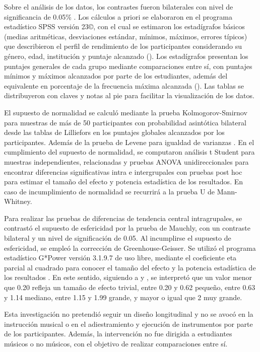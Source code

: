 \documentclass[spanish]{textolivre}
\begin{document}
Sobre el análisis de los datos, los contrastes fueron bilaterales con nivel de significancia de 0.05\% \cite{hernandez2014metodologia}. Los cálculos a priori se elaboraron en el programa estadístico SPSS versión 23©, con el cual se estimaron los estadígrafos básicos (medias aritméticas, desviaciones estándar, mínimos, máximos, errores típicos) que describieron el perfil de rendimiento de los participantes considerando su género, edad, institución y puntaje alcanzado (). Los estadígrafos presentan los puntajes generales de cada grupo mediante comparaciones entre sí, con puntajes mínimos y máximos alcanzados por parte de los estudiantes, además del equivalente en porcentaje de la frecuencia máxima alcanzada (). Las tablas se distribuyeron con claves y notas al pie para facilitar la visualización de los datos.

El supuesto de normalidad se calculó mediante la prueba Kolmogorov-Smirnov para muestras de más de 50 participantes con probabilidad asintótica bilateral desde las tablas de Lilliefors en los puntajes globales alcanzados por los participantes. Además de la prueba de Levene para igualdad de varianzas \cite{hernandez2014metodologia}. En el cumplimiento del supuesto de normalidad, se computaron análisis t Student para muestras independientes, relacionadas y pruebas ANOVA unidireccionales para encontrar diferencias significativas intra e intergrupales con pruebas post hoc para estimar el tamaño del efecto y potencia estadística de los resultados. En caso de incumplimiento de normalidad se recurrirá a la prueba U de Mann-Whitney.

Para realizar las pruebas de diferencias de tendencia central intragrupales, se contrastó el supuesto de esfericidad por la prueba de Mauchly, con un contraste bilateral y un nivel de significación de 0.05. Al incumplirse el supuesto de esfericidad, se empleó la corrección de Greenhouse-Geisser. Se utilizó el programa estadístico G*Power versión 3.1.9.7 de uso libre, mediante el coeficiente eta parcial al cuadrado para conocer el tamaño del efecto y la potencia estadística de los resultados \cite{cardenascastro2014potencia}. En este sentido, siguiendo a \textcite{cohen1986statistical} y \textcite{hopkins2014}, se interpretó que un valor menor que 0.20 refleja un tamaño de efecto trivial, entre 0.20 y 0.62 pequeño, entre 0.63 y 1.14 mediano, entre 1.15 y 1.99 grande, y mayor o igual que 2 muy grande.

Esta investigación no pretendió seguir un diseño longitudinal y no se avocó en la instrucción musical o en el adiestramiento y ejecución de instrumentos por parte de los participantes. Además, la intervención no fue dirigida a estudiantes músicos o no músicos, con el objetivo de realizar comparaciones entre sí.
\end{document}
